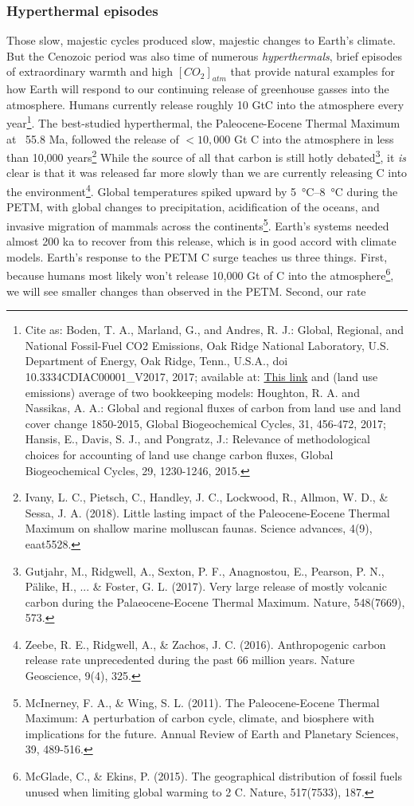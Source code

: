 \subsubsection{Hyperthermal episodes}
Those slow, majestic cycles produced slow, majestic changes to Earth's climate. But the Cenozoic period was also time of numerous \emph{hyperthermals}, brief episodes of extraordinary warmth and high $[CO_2]_{atm}$ that provide natural examples for how Earth will respond to our continuing release of greenhouse gasses into the atmosphere. Humans currently release roughly 10 GtC into the atmosphere every year\footnote{Cite as: Boden, T. A., Marland, G., and Andres, R. J.: Global, Regional, and National Fossil-Fuel CO2 Emissions, Oak Ridge National Laboratory, U.S. Department of Energy, Oak Ridge, Tenn., U.S.A., doi 10.3334\/CDIAC\/00001\_V2017, 2017; available at: \href{http://cdiac.ess-dive.lbl.gov/trends/emis/overview\_2014.html}{This link} and (land use emissions) average of two bookkeeping models: Houghton, R. A. and Nassikas, A. A.: Global and regional fluxes of carbon from land use and land cover change 1850-2015, Global Biogeochemical Cycles, 31, 456-472, 2017;  Hansis, E., Davis, S. J., and Pongratz, J.: Relevance of methodological choices for accounting of land use change carbon fluxes, Global Biogeochemical Cycles, 29, 1230-1246, 2015.}. The best-studied hyperthermal, the Paleocene-Eocene Thermal Maximum at ~55.8 Ma, followed the release of $<10,000$ Gt C into the atmosphere in less than 10,000 years\footnote{Ivany, L. C., Pietsch, C., Handley, J. C., Lockwood, R., Allmon, W. D., \& Sessa, J. A. (2018). Little lasting impact of the Paleocene-Eocene Thermal Maximum on shallow marine molluscan faunas. Science advances, 4(9), eaat5528.} While the source of all that carbon is still hotly debated\footnote{Gutjahr, M., Ridgwell, A., Sexton, P. F., Anagnostou, E., Pearson, P. N., P\"alike, H., ... \& Foster, G. L. (2017). Very large release of mostly volcanic carbon during the Palaeocene-Eocene Thermal Maximum. Nature, 548(7669), 573.}, it \emph{is} clear is that it was released far more slowly than we are currently releasing C into the environment\footnote{Zeebe, R. E., Ridgwell, A., \& Zachos, J. C. (2016). Anthropogenic carbon release rate unprecedented during the past 66 million years. Nature Geoscience, 9(4), 325.}. Global temperatures spiked upward by \SIrange{5}{8}{\celsius} during the PETM, with global changes to precipitation, acidification of the oceans, and invasive migration of mammals across the continents\footnote{McInerney, F. A., \& Wing, S. L. (2011). The Paleocene-Eocene Thermal Maximum: A perturbation of carbon cycle, climate, and biosphere with implications for the future. Annual Review of Earth and Planetary Sciences, 39, 489-516.}. Earth's systems needed almost 200 ka to recover from this release, which is in good accord with climate models. Earth's response to the PETM C surge teaches us three things. First, because humans most likely won't release 10,000 Gt of C into the atmosphere\footnote{McGlade, C., \& Ekins, P. (2015). The geographical distribution of fossil fuels unused when limiting global warming to 2 C. Nature, 517(7533), 187.}, we will see smaller changes than observed in the PETM. Second, our rate 